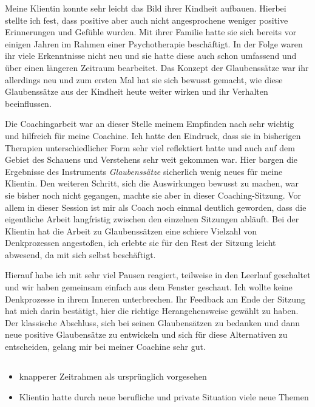 \documentclass[11pt,a4paper]{article}
\begin{document}
Meine Klientin konnte sehr leicht das Bild ihrer Kindheit aufbauen. Hierbei stellte ich fest, dass positive aber auch nicht angesprochene weniger positive Erinnerungen und Gefühle wurden. Mit ihrer Familie hatte sie sich bereits vor einigen Jahren im Rahmen einer Psychotherapie beschäftigt. In der Folge waren ihr viele Erkenntnisse nicht neu und sie hatte diese auch schon umfassend und über einen längeren Zeitraum bearbeitet. Das Konzept der Glaubenssätze war ihr allerdings neu und zum ersten Mal hat sie sich bewusst gemacht, wie diese Glaubenssätze aus der Kindheit heute weiter wirken und ihr Verhalten beeinflussen.

Die Coachingarbeit war an dieser Stelle meinem Empfinden nach sehr wichtig und hilfreich für meine Coachine. Ich hatte den Eindruck, dass sie in bisherigen Therapien unterschiedlicher Form sehr viel reflektiert hatte und auch auf dem Gebiet des Schauens und Verstehens sehr weit gekommen war. Hier bargen die Ergebnisse des Instruments \textsl{Glaubenssätze} sicherlich wenig neues für meine Klientin. Den weiteren Schritt, sich die Auswirkungen bewusst zu machen, war sie bisher noch nicht gegangen, machte sie aber in dieser Coaching-Sitzung. Vor allem in dieser Session ist mir als Coach noch einmal deutlich geworden, dass die eigentliche Arbeit langfristig zwischen den einzelnen Sitzungen abläuft. Bei der Klientin hat die Arbeit zu Glaubenssätzen eine schiere Vielzahl von Denkprozessen angestoßen, ich erlebte sie für den Rest der Sitzung leicht abwesend, da mit sich selbst beschäftigt. 

Hierauf habe ich mit sehr viel Pausen reagiert, teilweise in den Leerlauf geschaltet und wir haben gemeinsam einfach aus dem Fenster geschaut. Ich wollte keine Denkprozesse in ihrem Inneren unterbrechen. Ihr Feedback am Ende der Sitzung hat mich darin bestätigt, hier die richtige Herangehensweise gewählt zu haben. Der klassische Abschluss, sich bei seinen Glaubensätzen zu bedanken und dann neue positive Glaubensätze zu entwickeln und sich für diese Alternativen zu entscheiden, gelang mir bei meiner Coachine sehr gut. 



\subsection*{\color{Orange}{Dritte Sitzung: Trichtern mit Fragen für die Überprüfung der Ziele}}



\begin{itemize}

	\item knapperer Zeitrahmen als ursprünglich vorgesehen

	\item Klientin hatte durch neue berufliche und private Situation viele neue Themen

\end{itemize}
\end{document}
